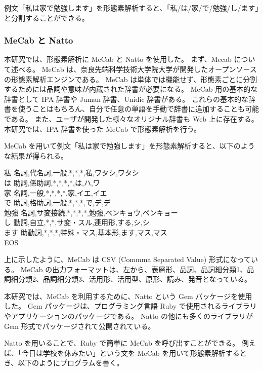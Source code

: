 \documentclass[11pt,a4j]{jsarticle}
\begin{document}
例文「私は家で勉強します」を形態素解析すると、「私/は/家/で/勉強/し/ます」と分割することができる。

\subsubsection{MeCab と Natto}
本研究では、形態素解析に MeCab と Natto を使用した。
まず、Mecab について述べる。
MeCab  は、奈良先端科学技術大学院大学が開発したオープンソースの形態素解析エンジンである。
MeCab は単体では機能せず、形態素ごとに分割するためには品詞や意味が内蔵された辞書が必要になる。
MeCab 用の基本的な辞書として IPA 辞書や Juman 辞書、Unidic 辞書がある。
これらの基本的な辞書を使うことはもちろん、自分で任意の単語を手動で辞書に追加することも可能である。
また、ユーザが開発した様々なオリジナル辞書も Web 上に存在する。
本研究では、IPA 辞書を使った MeCab で形態素解析を行う。

MeCab を用いて例文「私は家で勉強します」を形態素解析すると、以下のような結果が得られる。

\begin{itembox}[l]
私  名詞,代名詞,一般,*,*,*,私,ワタシ,ワタシ\\
は  助詞,係助詞,*,*,*,*,は,ハ,ワ\\
家  名詞,一般,*,*,*,*,家,イエ,イエ\\
で  助詞,格助詞,一般,*,*,*,で,デ,デ\\
勉強  名詞,サ変接続,*,*,*,*,勉強,ベンキョウ,ベンキョー\\
し  動詞,自立,*,*,サ変・スル,連用形,する,シ,シ\\
ます  助動詞,*,*,*,特殊・マス,基本形,ます,マス,マス\\
EOS
\end{itembox}

上に示したように、MeCab は CSV (Commma Separated Value) 形式になっている。
MeCab の出力フォーマットは、左から、表層形、品詞、品詞細分類1、品詞細分類2、品詞細分類3、活用形、活用型、原形、読み、発音となっている。

本研究では、MeCab を利用するために、Natto という Gem パッケージを使用した。
Gem パッケージは、プログラミング言語 Ruby で使用されるライブラリやアプリケーションのパッケージである。
Natto の他にも多くのライブラリが Gem 形式でパッケージされて公開されている。

Natto を用いることで、Ruby で簡単に MeCab を呼び出すことができる。
例えば、「今日は学校を休みたい」という文を MeCab を用いて形態素解析するとき、以下のようにプログラムを書く。

\newpage
\end{document}
